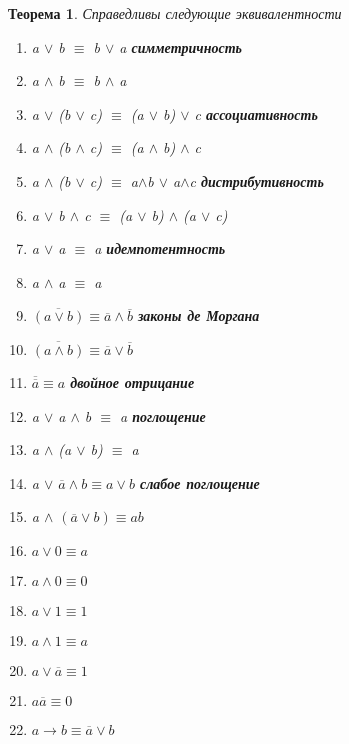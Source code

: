 \documentclass[a4paper]{article}
\newtheorem{theorem}{Теорема}[section]
\theoremstyle{definition}
\theoremstyle{remark}
\begin{document}
	\begin{theorem}
		Справедливы следующие эквивалентности
            \begin{enumerate}
                \item a $\vee$ b $\equiv$ b $\vee$ a  \textbf{симметричность}
                \item a $\wedge$ b $\equiv$ b $\wedge$ a
                \item a $\vee$ (b $\vee$ c) $\equiv$ (a $\vee$ b) $\vee$ c \textbf{ассоциативность}
                \item a $\wedge$ (b $\wedge$ c) $\equiv$ (a $\wedge$ b) $\wedge$ c
                \item a $\wedge$ (b $\vee$ c) $\equiv$ a$\wedge$b $\vee$ a$\wedge$c \textbf{дистрибутивность}
                \item a $\vee$  b $\wedge$ c $\equiv$ (a $\vee$ b) $\wedge$ (a $\vee$ c)
                \item a $\vee$ a $\equiv$ a \textbf{идемпотентность}
                \item a $\wedge$ a $\equiv$ a
                \item $\overline{(a \vee b)} \equiv \overline{a} \wedge \overline{b}$ \textbf{законы де Моргана}
                \item $\overline{(a \wedge b)} \equiv \overline{a} \vee \overline{b}$
                \item $\overline{\overline{a}} \equiv a$ \textbf{двойное отрицание}
                \item a $\vee$ a $\wedge$ b $\equiv$ a \textbf{поглощение}
                \item a $\wedge$ (a $\vee$ b) $\equiv$ a
                \item a $\vee$ $\overline{a} \wedge b \equiv a \vee b$ \textbf{слабое поглощение}
                \item a $\wedge$ $(\overline{a} \vee b) \equiv ab$
                \item $a \vee 0 \equiv a$
                \item $a \wedge 0 \equiv 0$
                \item $a \vee 1 \equiv 1$
                \item $a \wedge 1 \equiv a$
                \item $a \vee \overline{a} \equiv 1$
                \item $a\overline{a} \equiv 0$
                \item $a \rightarrow b \equiv \overline{a} \vee b$

\end{enumerate}
\end{theorem}
\end{document}
